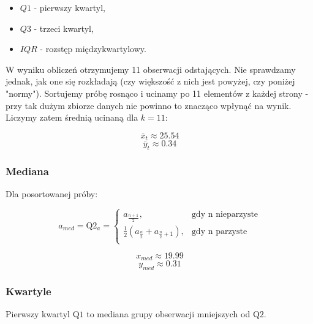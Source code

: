 \documentclass[fleqn]{article}
\begin{document}
    \begin{itemize}
        \item[] $Q1$ - pierwszy kwartyl,
        \item[] $Q3$ - trzeci kwartyl,
        \item[] $IQR$ - rozstęp międzykwartylowy.
    \end{itemize}
     
    


    \noindent W wyniku obliczeń otrzymujemy 11 obserwacji odstających. Nie sprawdzamy jednak, jak one się rozkładają (czy większość z nich jest powyżej, czy poniżej "normy").
    Sortujemy próbę rosnąco i ucinamy po 11 elementów z każdej strony - przy tak dużym zbiorze danych nie powinno to znacząco wpłynąć na wynik.
    Liczymy zatem średnią ucinaną dla $k=11$:


    $$\overline{x}_{t} \approx 25.54$$
    $$\overline{y}_{t} \approx 0.34$$

    \subsubsection{Mediana}

    Dla posortowanej próby:


    $$a_{med} = \text{Q}2_a = \begin{cases}
        a_{\frac{n+1}{2}}, & \text{gdy n nieparzyste}\\
        \frac{1}{2}\left(a_{\frac{n}{2}} + a_{\frac{n}{2}+1}\right), & \text{gdy n parzyste}\\
        \end{cases}$$

    
    $$x_{med} \approx 19.99$$
    $$y_{med} \approx 0.31$$

    \subsubsection{Kwartyle}

    Pierwszy kwartyl $\text{Q}1$ to mediana grupy obserwacji mniejszych od $\text{Q}2$.
\end{document}
